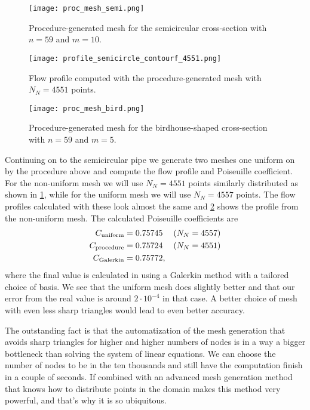 \documentclass[10pt,a4paper,twocolumn]{article}
\begin{document}
\begin{figure}[!t]
    \centering
    \texttt{[image: proc\_mesh\_semi.png]}
    \caption{Procedure-generated mesh for the semicircular cross-section with $n=59$ and $m=10$.}
    \label{fig:semi_proc_mesh}
\end{figure}

\begin{figure}[!b]
    \centering
    \texttt{[image: profile\_semicircle\_contourf\_4551.png]}
    \caption{Flow profile computed with the procedure-generated mesh with $N_N = 4551$ points.}
    \label{fig:profile_proc_semi}
\end{figure}

\begin{figure}[!b]
    \centering
    \texttt{[image: proc\_mesh\_bird.png]}
    \caption{Procedure-generated mesh for the birdhouse-shaped cross-section with $n=59$ and $m=5$.}
    \label{fig:proc_mesh_bird}
\end{figure}

Continuing on to the semicircular pipe we generate two meshes one uniform on by the procedure above and compute the flow profile and Poiseuille coefficient. For the non-uniform mesh we will use $N_N = 4551$ points similarly distributed as shown in \cref{fig:semi_proc_mesh}, while for the uniform mesh we will use $N_N = 4557$ points. The flow profiles calculated with these look almost the same and \cref{fig:profile_proc_semi} shows the profile from the non-uniform mesh. The calculated Poiseuille coefficients are
%
\begin{align}
    C_{\mathrm{uniform}} &= 0.75745 &(N_N = 4557)&\notag\\
    C_{\mathrm{procedure}} &= 0.75724 &(N_N = 4551)&\notag\\
    C_{\mathrm{Galerkin}} &= 0.75772,
\end{align}
%
where the final value is calculated in \cite{gal} using a Galerkin method with a tailored choice of basis. We see that the uniform mesh does slightly better and that our error from the real value is around $2 \cdot 10^{-4}$ in that case. A better choice of mesh with even less sharp triangles would lead to even better accuracy. 

The outstanding fact is that the automatization of the mesh generation that avoids sharp triangles for higher and higher numbers of nodes is in a way a bigger bottleneck than solving the system of linear equations. We can choose the number of nodes to be in the ten thousands and still have the computation finish in a couple of seconds. If combined with an advanced mesh generation method that knows how to distribute points in the domain makes this method very powerful, and that's why it is so ubiquitous. 
\end{document}
